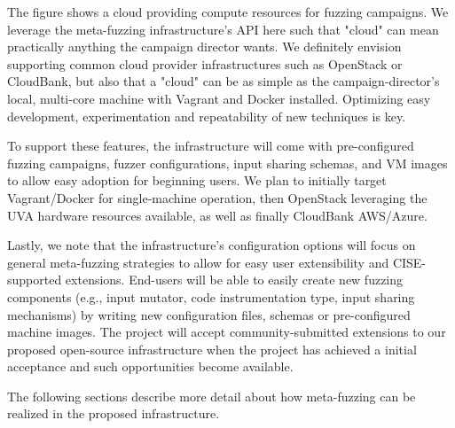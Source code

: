 The figure shows a cloud providing compute resources for fuzzing campaigns.  
We leverage the meta-fuzzing infrastructure's API here such that "cloud" can 
mean practically anything the campaign director wants.  We definitely envision
supporting common cloud provider infrastructures such as OpenStack or CloudBank, but
also that a "cloud" can be as simple as the campaign-director's local, multi-core machine 
with Vagrant and Docker installed.  Optimizing easy development, experimentation and repeatability
of new techniques is key. 

To support these features, the infrastructure will come with pre-configured 
fuzzing campaigns, fuzzer configurations, input sharing schemas, and VM images to allow easy adoption for 
beginning users.  We plan to initially target Vagrant/Docker for single-machine operation, then OpenStack leveraging the UVA 
hardware resources available, as well as finally CloudBank AWS/Azure.

Lastly, we note that the infrastructure's configuration options will focus on general meta-fuzzing strategies 
to allow for easy user extensibility and CISE-supported extensions.  
End-users will be able to easily create 
new fuzzing components (e.g., input mutator, code instrumentation type, input 
sharing mechanisms) by writing new configuration files, schemas or 
pre-configured machine images.  The project will accept 
community-submitted extensions to our proposed open-source infrastructure when 
the project has achieved a initial acceptance and such opportunities become available.

The following sections describe more detail about how meta-fuzzing can be realized 
in the proposed infrastructure.


